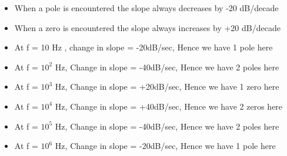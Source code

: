 \documentclass[journal,12pt,twocolumn]{IEEEtran}
\renewcommand\thesection{\arabic{section}}
\begin{document}
\begin{enumerate}[label=\arabic*.,ref=\thesection.\theenumi]
\begin{itemize}
    \item  When a pole is encountered the slope always decreases by -20 dB/decade
    \item When a zero is encountered the slope always increases by +20 dB/decade
\end{itemize}
\begin{itemize}
    \item At f = 10 Hz , change in slope = -20dB/sec, Hence we have 1 pole here
    \item At f = $10^{2}$ Hz, Change in slope = -40dB/sec, Hence we have 2 poles here
    
    
    
\end{itemize}

\begin{itemize}
\item At f = $10^{3}$ Hz, Change in slope = +20dB/sec, Hence we have 1 zero here
\item At f = $10^{4}$ Hz, Change in slope = +40dB/sec, Hence we have 2 zeros here

    
\end{itemize}



\begin{itemize}

    \item At f = $10^{5}$ Hz, Change in slope = -40dB/sec, Hence we have 2 poles here
    \item At f = $10^{6}$ Hz, Change in slope = -20dB/sec, Hence we have 1 pole here
    
\end{itemize}


\end{enumerate}
\end{document}
